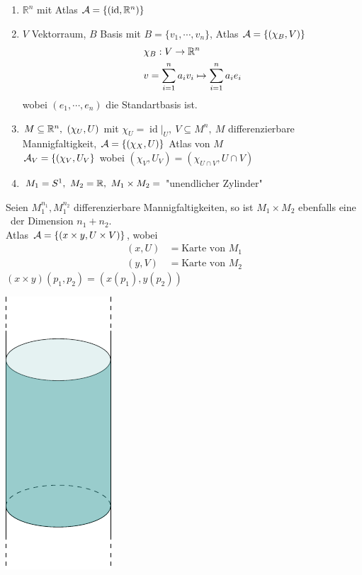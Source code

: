 \begin{bsp}
\begin{enumerate}
\item$\mathbb{R}^n$ mit Atlas $\mathcal{A} = \{(\operatorname{id}, \mathbb{R}^n)\}$
\item$V$ Vektorraum, $B$ Basis mit $B = \{v_1, \cdots, v_n\}$, Atlas $\mathcal{A} = \left\{(\chi_B, V)\right\}$
\begin{align*}
& \chi_B: V \rightarrow \mathbb{R}^n\\
& v = \sum^n_{i=1} a_i v_i \mapsto \sum_{i=1}^n a_i e_i
\end{align*}
wobei $(e_1, \cdots, e_n)$ die Standartbasis ist.
\item$M\subseteq \mathbb{R}^n,\ (\chi_U, U)$ mit $\chi_U = \operatorname{id}\vert_U,\ V \subseteq M^n,\ M$ differenzierbare Mannigfaltigkeit, $\mathcal{A} = \left\{(\chi_X, U)\right\}$ Atlas von $M$\\
$\mathcal{A}_V = \left\{(\chi_V, U_V\right\}$ wobei $(\chi_V, U_V) = (\chi_{U\cap V}, U\cap V)$
\item$M_1 = S^1,\ M_2 = \mathbb{R},\ M_1\times M_2 =$ "unendlicher Zylinder"
\end{enumerate}
\hspace{.06\textwidth}
\begin{minipage}[H]{0.8\textwidth}
Seien $M_1^{n_1}, M_1^{n_2}$ differenzierbare Mannigfaltigkeiten, so ist $M_1\times M_2$ ebenfalls eine \difM \ der Dimension $n_1 + n_2$.\\
Atlas $\mathcal{A} = \left\{(x\times y, U\times V)\right\}$, wobei 
\begin{align*}
(x, U) &= \text{Karte von } M_1\\
(y, V) &= \text{Karte von } M_2
\end{align*}
$(x\times y)(p_1, p_2) = (x(p_1), y(p_2))$
\end{minipage}
\hspace{1cm}
\begin{minipage}[H]{.2\textwidth}
\vspace{-1.5cm}
\includegraphics[scale=0.5]{figures/tikz/cylinder.pdf}
\end{minipage}
\end{bsp}

